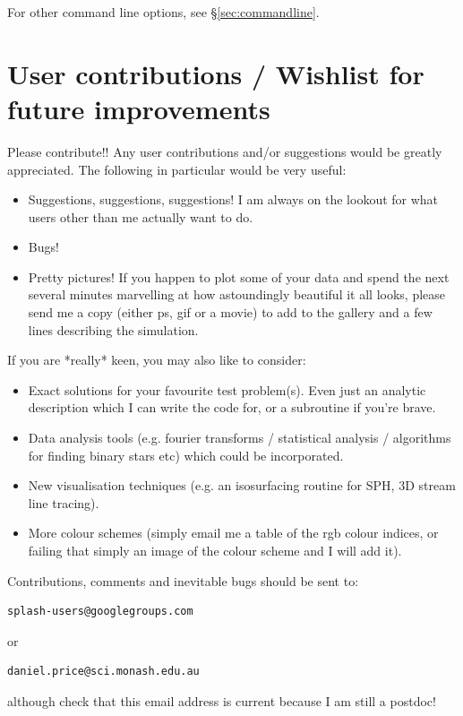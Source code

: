 \documentclass[a4paper,10pt]{article}
\begin{document}
  For other command line options, see \S\ref{sec:commandline}.

\section{User contributions / Wishlist for future improvements}
 Please contribute!! Any user contributions and/or suggestions would be greatly
appreciated. The following in particular would be very useful:
\begin{itemize}
\item Suggestions, suggestions, suggestions! I am always on the lookout for what users other than me actually want to do.
\item Bugs!
\item Pretty pictures! If you happen to plot some of your data and spend the
next several minutes marvelling at how astoundingly beautiful it all looks, please send
me a copy (either ps, gif or a movie) to add to the gallery and a few lines
describing the simulation.
\end{itemize}
If you are *really* keen, you may also like to consider:
\begin{itemize}
\item Exact solutions for your favourite test problem(s). Even just an analytic description which I can write the code for, or a subroutine if you're brave.
\item Data analysis tools (e.g. fourier transforms / statistical analysis /
algorithms for finding binary stars etc) which could be incorporated.
\item New visualisation techniques (e.g. an isosurfacing routine for SPH, 3D stream line tracing).
\item More colour schemes (simply email me a table of the rgb colour indices, or failing that simply an image of the colour scheme and I will add it).
\end{itemize}
Contributions, comments and inevitable bugs should be sent to:
\begin{verbatim}
splash-users@googlegroups.com
\end{verbatim}
or
\begin{verbatim}
daniel.price@sci.monash.edu.au
\end{verbatim}
although check that this email address is current because I am still a postdoc!
\end{document}
